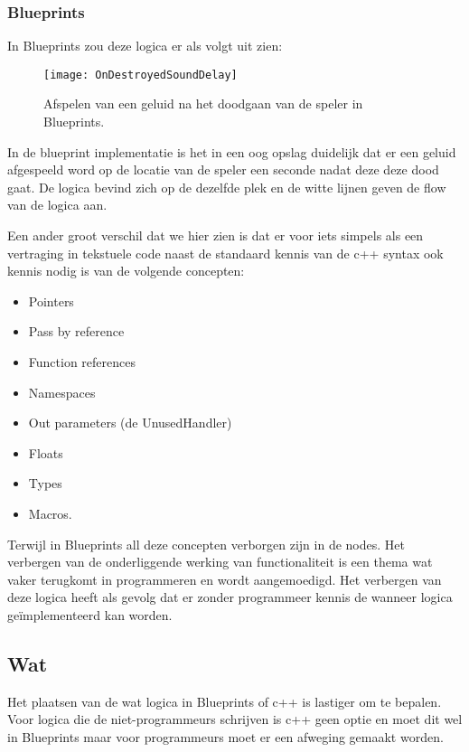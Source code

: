 \subsubsection{Blueprints}
In Blueprints zou deze logica er als volgt uit zien:

\begin{figure}[!ht]
  \centering
    \texttt{[image: OnDestroyedSoundDelay]}
    \caption{Afspelen van een geluid na het doodgaan van de speler in Blueprints.}
\end{figure}

In de blueprint implementatie is het in een oog opslag duidelijk dat er een geluid afgespeeld word op de locatie van de speler een seconde nadat deze deze dood gaat. De logica bevind zich op de dezelfde plek en de witte lijnen geven de flow van de logica aan. 

Een ander groot verschil dat we hier zien is dat er voor iets simpels als een vertraging in tekstuele code naast de standaard kennis van de c++ syntax ook kennis nodig is van de volgende concepten:

\begin{itemize}
	\item Pointers
	\item Pass by reference
	\item Function references
	\item Namespaces
	\item Out parameters (de UnusedHandler)
	\item Floats
	\item Types
	\item Macros. 
\end{itemize}

Terwijl in Blueprints all deze concepten verborgen zijn in de nodes. Het verbergen van de onderliggende werking van functionaliteit is een thema wat vaker terugkomt in programmeren en wordt aangemoedigd. Het verbergen van deze logica heeft als gevolg dat er zonder programmeer kennis de wanneer logica geïmplementeerd kan worden.

\subsection{Wat}

Het plaatsen van de wat logica in Blueprints of c++ is lastiger om te bepalen. Voor logica die de niet-programmeurs schrijven is c++ geen optie en moet dit wel in Blueprints maar voor programmeurs moet er een afweging gemaakt worden.

